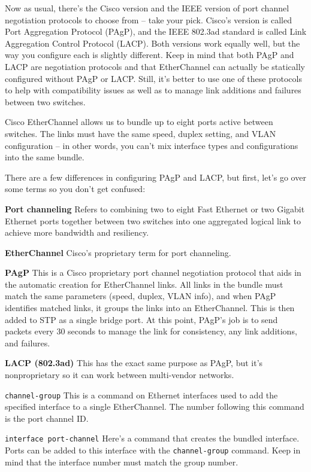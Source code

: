 Now as usual, there's
the Cisco version and the IEEE version of port channel negotiation
protocols to choose from -- take your pick. Cisco's version is called
Port Aggregation Protocol (PAgP), and the IEEE 802.3ad standard is
called Link Aggregation Control Protocol (LACP). Both versions work
equally well, but the way you configure each is slightly different. Keep
in mind that both PAgP and LACP are negotiation protocols and that
EtherChannel can actually be statically configured without PAgP or LACP.
Still, it's better to use one of these protocols to help with
compatibility issues as well as to manage link additions and failures
between two switches.

Cisco EtherChannel allows us to bundle up to eight ports active between
switches. The links must have the same speed, duplex setting, and VLAN
configuration -- in other words, you can't mix interface types and
configurations into the same bundle.

There are a few differences in configuring PAgP and LACP, but first,
let's go over some terms so you don't get confused:

\textbf{Port channeling} Refers to combining two to eight Fast Ethernet
or two Gigabit Ethernet ports together between two switches into one
aggregated logical link to achieve more bandwidth and resiliency.

\textbf{EtherChannel} Cisco's proprietary term for port channeling.

\textbf{PAgP} This is a Cisco proprietary port channel negotiation
protocol that aids in the automatic creation for EtherChannel links. All
links in the bundle must match the same parameters (speed, duplex, VLAN
info), and when PAgP identifies matched links, it groups the links into
an EtherChannel. This is then added to STP as a single bridge port. At
this point, PAgP's job is to send packets every 30 seconds to manage the
link for consistency, any link additions, and failures.

\textbf{LACP (802.3ad)} This has the exact same purpose as PAgP, but
it's nonproprietary so it can work between multi-vendor networks.

\texttt{channel-group} This is a command on Ethernet interfaces used to
add the specified interface to a single EtherChannel. The number
following this command is the port channel ID.

\texttt{interface\ port-channel} Here's a command that creates the
bundled interface. Ports can be added to this interface with the
\texttt{channel-group} command. Keep in mind that the interface number
must match the group number.

